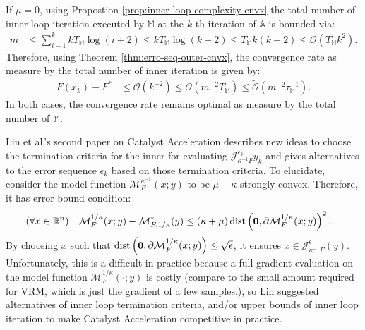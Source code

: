 \documentclass[12pt]{article}
\begin{document}
            \par
            If $\mu = 0$, using Propostion \ref{prop:inner-loop-complexity-cnvx} the total number of inner loop iteration executed by $\mathbb M$ at the $k$ th iteration of $\mathbb A$ is bounded via: 
            \begin{align*}
                m &\le \sum_{i - 1}^{k} k T_{\mathbb M} \log(i + 2) \le k T_{\mathbb M} \log(k + 2) 
                \le T_{\mathbb M}k(k + 2) 
                \le 
                \mathcal O(T_{\mathbb M} k^2). 
            \end{align*}
            Therefore, using Theorem \ref{thm:erro-seq-outer-cnvx}, the convergence rate as measure by the total number of inner iteration is given by: 
            \begin{align*}
                F(x_k)- F^* &\le 
                \mathcal O(k^{-2})\le 
                \mathcal O
                    \left(
                        m^{-2}T_{\mathbb M}
                    \right) 
                    \le \widetilde{\mathcal O}
                        \left(m^{-2}\tau_{\mathbb M}^{-1}\right). 
            \end{align*}
            In both cases, the convergence rate remains optimal as measure by the total number of $\mathbb M$. 
            \par 
            Lin et al.'s second paper on Catalyst Acceleration \cite{lin_catalyst_2018} describes new ideas to choose the termination criteria for the inner for evaluating $\mathcal J_{\kappa^{-1}F}^{\epsilon_k} y_k$ and gives alternatives to the error sequence $\epsilon_k$ based on those termination criteria. 
            To elucidate, consider the model function $\mathcal M_F^{\kappa^{-1}}(x; y)$ to be $\mu + \kappa$ strongly convex. 
            Therefore, it has error bound condition: 
            \begin{align*}
                (\forall x\in \mathbb R^n) \quad 
                \mathcal M^{1/\kappa}_F(x; y) -
                \mathcal M_{F, 1/\kappa}^*(y) 
                &\le (\kappa + \mu)\operatorname{dist}
                    \left(
                        \mathbf 0, \partial \mathcal M^{1/\kappa}_F(x; y)
                    \right)^2. 
            \end{align*}
            By choosing $x$ such that $\operatorname{dist}\left(\mathbf 0, \partial \mathcal M_F^{1/\kappa}(x; y)\right) \le \sqrt{\epsilon}$, it ensures $x \in \mathcal J^\epsilon_{\kappa^{-1}F}(y)$. 
            Unfortunately, this is a difficult in practice because a full gradient evaluation on the model function $\mathcal M^{1/\kappa}_F(\cdot; y)$ is costly (compare to the small amount required for VRM, which is just the gradient of a few samples.), so Lin suggested alternatives of inner loop termination criteria, and/or upper bounds of inner loop iteration to make Catalyst Acceleration competitive in practice. 
\end{document}
